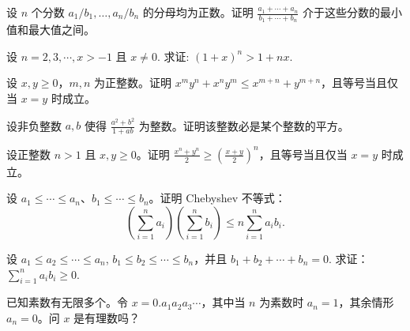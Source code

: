 \newpage
\noindent\begin{minipage}{\textwidth}
设 $n$ 个分数 $a_1/b_1,\ldots,a_n/b_n$ 的分母均为正数。证明 $\frac{a_1+\cdots+a_n}{b_1+\cdots+b_n}$ 介于这些分数的最小值和最大值之间。
\end{minipage}\par\vfill
\noindent\begin{minipage}{\textwidth}
设  $ n=2,3,\cdots,x>-1 $ 且  $ x\neq0 $. 求证:  $ (1+x)^{n}>1+nx $.
\end{minipage}\par\vfill
\noindent\begin{minipage}{\textwidth}
设 $x,y\ge0$，$m,n$ 为正整数。证明 $x^my^n+x^ny^m\le x^{m+n}+y^{m+n}$，且等号当且仅当 $x=y$ 时成立。
\end{minipage}\par\vfill
\newpage
\noindent\begin{minipage}{\textwidth}
设非负整数 $a,b$ 使得 $\frac{a^2+b^2}{1+ab}$ 为整数。证明该整数必是某个整数的平方。
\end{minipage}\par\vfill
\noindent\begin{minipage}{\textwidth}
设正整数 $n>1$ 且 $x,y\ge0$。证明 $\frac{x^n+y^n}{2}\ge\left(\frac{x+y}{2}\right)^n$，且等号当且仅当 $x=y$ 时成立。
\end{minipage}\par\vfill
\noindent\begin{minipage}{\textwidth}
设 $a_1\le\cdots\le a_n$、$b_1\le\cdots\le b_n$。证明 Chebyshev 不等式：\[\left(\sum_{i=1}^na_i\right)\left(\sum_{i=1}^nb_i\right)\le n\sum_{i=1}^na_ib_i.\]
\end{minipage}\par\vfill
\newpage
\noindent\begin{minipage}{\textwidth}
设  $ a_{1} \leqslant a_{2} \leqslant \cdots \leqslant a_{n} $,  $ b_{1} \leqslant b_{2} \leqslant \cdots \leqslant b_{n} $，并且  $ b_{1} + b_{2} + \cdots + b_{n} = 0 $. 求证： $ \sum_{i=1}^{n} a_{i} b_{i} \geqslant 0 $.
\end{minipage}\par\vfill
\noindent\begin{minipage}{\textwidth}
已知素数有无限多个。令 $x=0.a_1a_2a_3\cdots$，其中当 $n$ 为素数时 $a_n=1$，其余情形 $a_n=0$。问 $x$ 是有理数吗？
\end{minipage}\par\vfill

